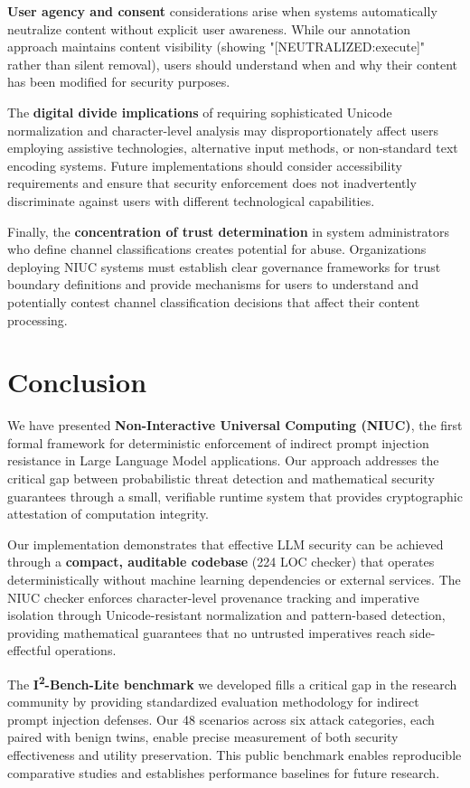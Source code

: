 \textbf{User agency and consent} considerations arise when systems automatically neutralize content without explicit user awareness. While our annotation approach maintains content visibility (showing "[NEUTRALIZED:execute]" rather than silent removal), users should understand when and why their content has been modified for security purposes.

The \textbf{digital divide implications} of requiring sophisticated Unicode normalization and character-level analysis may disproportionately affect users employing assistive technologies, alternative input methods, or non-standard text encoding systems. Future implementations should consider accessibility requirements and ensure that security enforcement does not inadvertently discriminate against users with different technological capabilities.

Finally, the \textbf{concentration of trust determination} in system administrators who define channel classifications creates potential for abuse. Organizations deploying NIUC systems must establish clear governance frameworks for trust boundary definitions and provide mechanisms for users to understand and potentially contest channel classification decisions that affect their content processing.

\section{Conclusion}

We have presented \textbf{Non-Interactive Universal Computing (NIUC)}, the first formal framework for deterministic enforcement of indirect prompt injection resistance in Large Language Model applications. Our approach addresses the critical gap between probabilistic threat detection and mathematical security guarantees through a small, verifiable runtime system that provides cryptographic attestation of computation integrity.

Our implementation demonstrates that effective LLM security can be achieved through a \textbf{compact, auditable codebase} (224 LOC checker) that operates deterministically without machine learning dependencies or external services. The NIUC checker enforces character-level provenance tracking and imperative isolation through Unicode-resistant normalization and pattern-based detection, providing mathematical guarantees that no untrusted imperatives reach side-effectful operations.

The \textbf{I\textsuperscript{2}-Bench-Lite benchmark} we developed fills a critical gap in the research community by providing standardized evaluation methodology for indirect prompt injection defenses. Our 48 scenarios across six attack categories, each paired with benign twins, enable precise measurement of both security effectiveness and utility preservation. This public benchmark enables reproducible comparative studies and establishes performance baselines for future research.

